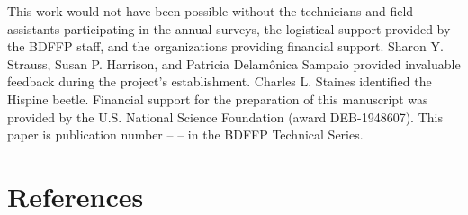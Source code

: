 \documentclass[
  12pt,
  man, donotrepeattitle,floatsintext]{apa6}
\begin{document}
\noindent  
This work would not have been possible without the technicians and field assistants participating in the annual surveys, the logistical support provided by the BDFFP staff, and the organizations providing financial support. Sharon Y. Strauss, Susan P. Harrison, and Patricia Delamônica Sampaio provided invaluable feedback during the project's establishment. Charles L. Staines identified the Hispine beetle. Financial support for the preparation of this manuscript was provided by the U.S. National Science Foundation (award DEB-1948607). This paper is publication number -- -- in the BDFFP Technical Series.

\newpage

\hypertarget{references}{%
\section{References}\label{references}}

\begingroup
\setlength{\parindent}{0in}
\setlength{\leftskip}{0in}
\end{document}
